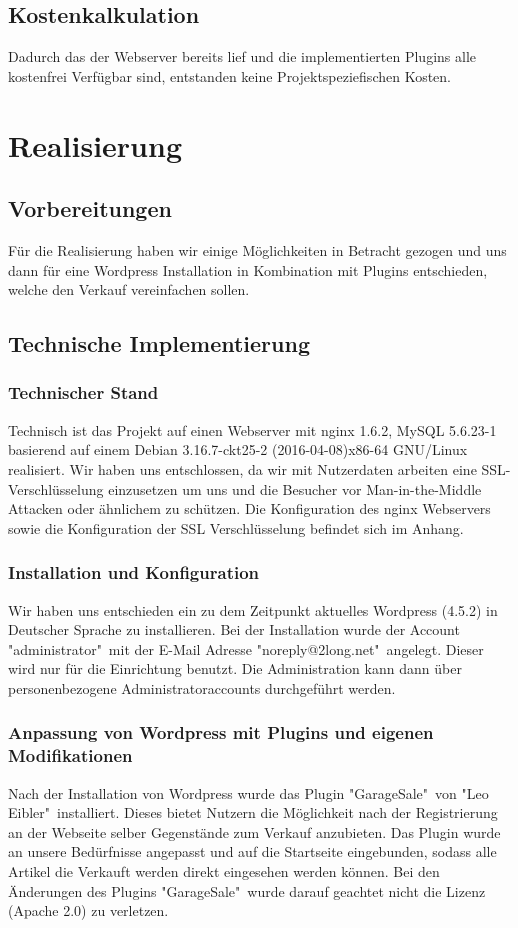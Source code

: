 \documentclass[a4paper, DIV20, 11pt, headsepline, parskip]{article}
\begin{document}
\subsection{Kostenkalkulation}
Dadurch das der Webserver bereits lief und die implementierten Plugins alle kostenfrei Verfügbar sind, entstanden keine Projektspeziefischen Kosten.
\section{Realisierung}
\subsection{Vorbereitungen}
Für die Realisierung haben wir einige Möglichkeiten in Betracht gezogen und uns dann für eine Wordpress Installation in Kombination mit Plugins entschieden, welche den Verkauf vereinfachen sollen.
\subsection{Technische Implementierung}
\subsubsection{Technischer Stand}
Technisch ist das Projekt auf einen Webserver mit nginx 1.6.2,
MySQL 5.6.23-1 basierend auf einem
Debian 3.16.7-ckt25-2 (2016-04-08)x86-64 GNU/Linux 
realisiert.
Wir haben uns entschlossen, da wir mit Nutzerdaten arbeiten eine SSL-Verschlüsselung einzusetzen um uns und die Besucher vor Man-in-the-Middle Attacken oder ähnlichem zu schützen.
Die Konfiguration des nginx Webservers sowie die Konfiguration der SSL Verschlüsselung befindet sich im Anhang.
\subsubsection{Installation und Konfiguration}
Wir haben uns entschieden ein zu dem Zeitpunkt aktuelles Wordpress (4.5.2) in Deutscher Sprache zu installieren.
Bei der Installation wurde der Account "administrator"\ mit der E-Mail Adresse "noreply@2long.net"\ angelegt.
Dieser wird nur für die Einrichtung benutzt.
Die Administration kann dann über personenbezogene Administratoraccounts durchgeführt werden.
\subsubsection{Anpassung von Wordpress mit Plugins und eigenen Modifikationen}
Nach der Installation von Wordpress wurde das Plugin "GarageSale"\ von "Leo Eibler"\ installiert.
Dieses bietet Nutzern die Möglichkeit nach der Registrierung an der Webseite selber Gegenstände zum Verkauf anzubieten.
Das Plugin wurde an unsere Bedürfnisse angepasst und auf die Startseite eingebunden, sodass alle Artikel die Verkauft werden direkt eingesehen werden können.
Bei den Änderungen des Plugins "GarageSale"\ wurde darauf geachtet nicht die Lizenz (Apache 2.0) zu verletzen.
\end{document}
